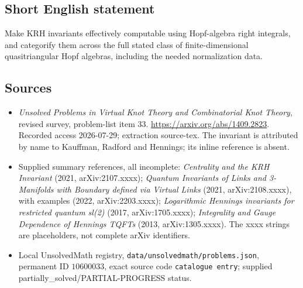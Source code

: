 \documentclass[11pt]{article}
\begin{document}
\subsection{Short English statement}
Make KRH invariants effectively computable using Hopf-algebra right integrals, and categorify them across the full stated class of finite-dimensional quasitriangular Hopf algebras, including the needed normalization data.
\subsection{Sources}
\begin{itemize}
\item \emph{Unsolved Problems in Virtual Knot Theory and Combinatorial Knot Theory}, revised survey, problem-list item 33. \url{https://arxiv.org/abs/1409.2823}. Recorded access 2026-07-29; extraction source-tex. The invariant is attributed by name to Kauffman, Radford and Hennings; its inline reference is absent.
\item Supplied summary references, all incomplete: \emph{Centrality and the KRH Invariant} (2021, arXiv:2107.xxxx); \emph{Quantum Invariants of Links and 3-Manifolds with Boundary defined via Virtual Links} (2021, arXiv:2108.xxxx), with examples (2022, arXiv:2203.xxxx); \emph{Logarithmic Hennings invariants for restricted quantum sl(2)} (2017, arXiv:1705.xxxx); \emph{Integrality and Gauge Dependence of Hennings TQFTs} (2013, arXiv:1305.xxxx). The xxxx strings are placeholders, not complete arXiv identifiers.
\item Local UnsolvedMath registry, \texttt{data/unsolvedmath/problems.json}, permanent ID \(10600033\), exact source code \texttt{catalogue entry}; supplied partially\_solved/PARTIAL-PROGRESS status.
\end{itemize}
\end{document}

